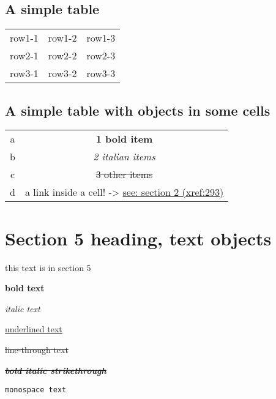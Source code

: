 \documentclass[11pt]{article}
\begin{document}
\subsection{A simple table  }
 \label{obj-244}
 \label{obj-243}
\begin{tabular}{|c|c|c|}
\hline
 row1-1  &  row1-2  &  row1-3  \\
 row2-1  &  row2-2  &  row2-3  \\
 row3-1  &  row3-2  &  row3-3  \\
\hline
\end{tabular}
\vspace{\baselineskip}
\subsection{A simple table with objects in some cells  }
 \label{obj-270}
 \label{obj-269}
\begin{tabular}{|c|c|}
\hline
 a  & \textbf{1 bold item} \\
 b  & \emph{2 italian items} \\
 c  & \sout{3 other items} \\
 d  & a link inside a cell! -\textgreater{} \hyperref[obj-42]{see: section 2 (xref:293)} \\
\hline
\end{tabular}
\vspace{\baselineskip}
\section{Section 5 heading, text objects  }
 \label{obj-297}
 \label{obj-296}
this text is in section 5

\textbf{bold text}

\emph{italic text}

\underline{underlined text}

\sout{line-through text}

\textbf{\emph{\sout{bold italic strikethrough}}}

\vspace{\baselineskip}
\texttt{monospace text}
\end{document}
